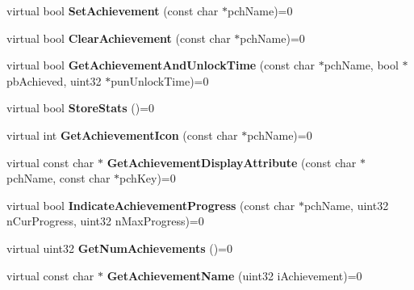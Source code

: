 \begin{DoxyCompactItemize}
\mbox{\label{class_i_steam_user_stats_adb1050d4a2dec1b3d746ae5d26cb9db5}} 
virtual bool {\bfseries Set\+Achievement} (const char $\ast$pch\+Name)=0
\item 
\mbox{\label{class_i_steam_user_stats_ae187d50ec8b6730932234f4739b57326}} 
virtual bool {\bfseries Clear\+Achievement} (const char $\ast$pch\+Name)=0
\item 
\mbox{\label{class_i_steam_user_stats_a28ea2e320d99ef2df4c8ff3969ca2612}} 
virtual bool {\bfseries Get\+Achievement\+And\+Unlock\+Time} (const char $\ast$pch\+Name, bool $\ast$pb\+Achieved, uint32 $\ast$pun\+Unlock\+Time)=0
\item 
\mbox{\label{class_i_steam_user_stats_af80aba36654117e952c1b5507b0865b0}} 
virtual bool {\bfseries Store\+Stats} ()=0
\item 
\mbox{\label{class_i_steam_user_stats_abfd345e6efbd85b068074f535a32a58e}} 
virtual int {\bfseries Get\+Achievement\+Icon} (const char $\ast$pch\+Name)=0
\item 
\mbox{\label{class_i_steam_user_stats_a2c29d874a3cb979f6e8c4fc237b03ceb}} 
virtual const char $\ast$ {\bfseries Get\+Achievement\+Display\+Attribute} (const char $\ast$pch\+Name, const char $\ast$pch\+Key)=0
\item 
\mbox{\label{class_i_steam_user_stats_af03a0d67c7b14e664701eb83bbc8552e}} 
virtual bool {\bfseries Indicate\+Achievement\+Progress} (const char $\ast$pch\+Name, uint32 n\+Cur\+Progress, uint32 n\+Max\+Progress)=0
\item 
\mbox{\label{class_i_steam_user_stats_a61cf7dd5f4d80fbb278b68211613d732}} 
virtual uint32 {\bfseries Get\+Num\+Achievements} ()=0
\item 
\mbox{\label{class_i_steam_user_stats_a1a9245175aadab7ee2564502b0ab5282}} 
virtual const char $\ast$ {\bfseries Get\+Achievement\+Name} (uint32 i\+Achievement)=0
\item 
\mbox{\label{class_i_steam_user_stats_aa0e02e12a7ce9fe7645d3d459a9ca9ed}} 

\end{DoxyCompactItemize}
